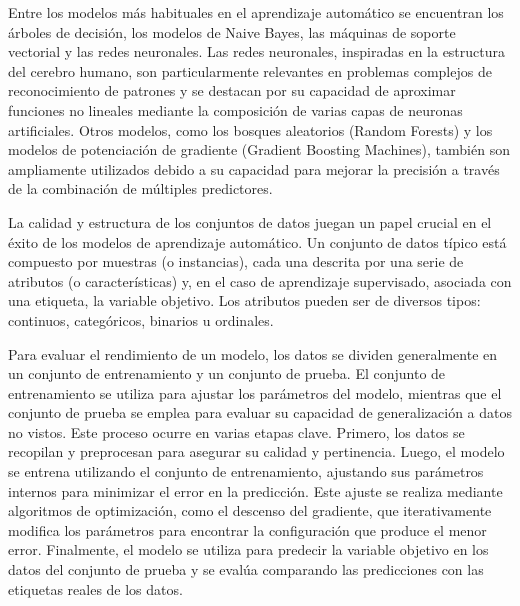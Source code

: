 Entre los modelos más habituales en el aprendizaje automático se encuentran los árboles de decisión, los modelos de Naive Bayes, las máquinas de soporte vectorial y las redes neuronales. Las redes neuronales, inspiradas en la estructura del cerebro humano, son particularmente relevantes en problemas complejos de reconocimiento de patrones y se destacan por su capacidad de aproximar funciones no lineales mediante la composición de varias capas de neuronas artificiales. Otros modelos, como los bosques aleatorios (Random Forests) y los modelos de potenciación de gradiente (Gradient Boosting Machines), también son ampliamente utilizados debido a su capacidad para mejorar la precisión a través de la combinación de múltiples predictores.

La calidad y estructura de los conjuntos de datos juegan un papel crucial en el éxito de los modelos de aprendizaje automático. Un conjunto de datos típico está compuesto por muestras (o instancias), cada una descrita por una serie de atributos (o características) y, en el caso de aprendizaje supervisado, asociada con una etiqueta, la variable objetivo. Los atributos pueden ser de diversos tipos: continuos, categóricos, binarios u ordinales.

Para evaluar el rendimiento de un modelo, los datos se dividen generalmente en un conjunto de entrenamiento y un conjunto de prueba. El conjunto de entrenamiento se utiliza para ajustar los parámetros del modelo, mientras que el conjunto de prueba se emplea para evaluar su capacidad de generalización a datos no vistos. Este proceso ocurre en varias etapas clave. Primero, los datos se recopilan y preprocesan para asegurar su calidad y pertinencia. Luego, el modelo se entrena utilizando el conjunto de entrenamiento, ajustando sus parámetros internos para minimizar el error en la predicción. Este ajuste se realiza mediante algoritmos de optimización, como el descenso del gradiente, que iterativamente modifica los parámetros para encontrar la configuración que produce el menor error. Finalmente, el modelo se utiliza para predecir la variable objetivo en los datos del conjunto de prueba y se evalúa comparando las predicciones con las etiquetas reales de los datos.

